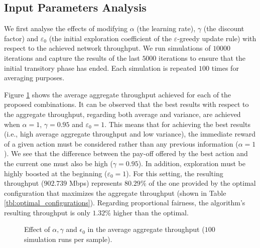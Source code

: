 \documentclass[conference]{IEEEtran}
\begin{document}
	\subsection{Input Parameters Analysis}
	\label{section:practical_analysis}	
	We first analyse the effects of modifying $\alpha$ (the learning rate), $\gamma$ (the discount factor) and $\varepsilon_0$ (the initial exploration coefficient of the $\varepsilon$-greedy update rule) with respect to the achieved network throughput. We run simulations of $10000$ iterations and capture the results of the last $5000$ iterations to ensure that the initial transitory phase has ended. Each simulation is repeated $100$ times for averaging purposes. 
	
	Figure \ref{fig:ql_alpha_gamma_epsilon_evaluation} shows the average aggregate throughput achieved for each of the proposed combinations. It can be observed that the best results with respect to the aggregate throughput, regarding both average and variance, are achieved when $\alpha = 1$, $\gamma = 0.95$ and $\varepsilon_0 = 1$. This means that for achieving the best results (i.e., high average aggregate throughput and low variance), the immediate reward of a given action must be considered rather than any previous information ($\alpha = 1$). We see that the difference between the pay-off offered by the best action and the current one must also be high ($\gamma = 0.95$). In addition, exploration must be highly boosted at the beginning ($\varepsilon_0=1$). For this setting, the resulting throughput ($902.739$ Mbps) represents $80.29$\% of the one provided by the optimal configuration that maximizes the aggregate throughput (shown in Table \ref{tbl:optimal_configurations}). Regarding proportional fairness, the algorithm's resulting throughput is only $1.32$\% higher than the optimal. 
	\begin{figure}[]
		\centering
		\caption{Effect of $\alpha, \gamma$ and $\epsilon_0$ in the average aggregate throughput ($100$ simulation runs per sample).}
		\label{fig:ql_alpha_gamma_epsilon_evaluation}
	\end{figure}	
	
\end{document}
